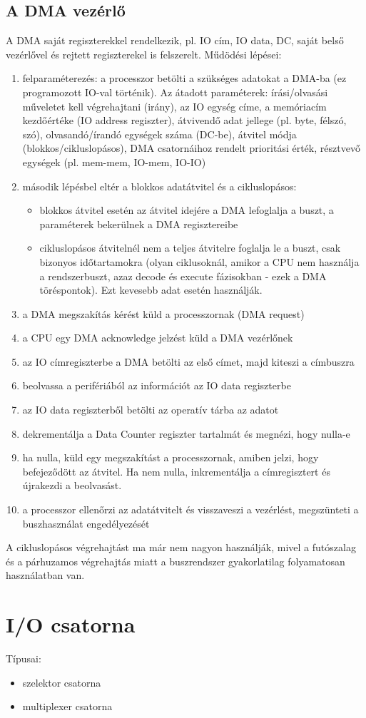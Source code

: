 \subsection{A DMA vezérlő}
A DMA saját regiszterekkel rendelkezik, pl. IO cím, IO data, DC, saját belső vezérlővel és rejtett regiszterekel is felszerelt.
Műdödési lépései:
\begin{enumerate}
    \item felparaméterezés: a processzor betölti a szükséges adatokat a DMA-ba (ez programozott IO-val történik). Az átadott paraméterek: írási/olvasási műveletet kell végrehajtani (irány), az IO egység címe, a memóriacím kezdőértéke (IO address regiszter), átvivendő adat jellege (pl. byte, félszó, szó), olvasandó/írandó egységek száma (DC-be), átvitel módja (blokkos/cikluslopásos), DMA csatornáihoz rendelt prioritási érték, résztvevő egységek (pl. mem-mem, IO-mem, IO-IO)
    \item második lépésbel eltér a blokkos adatátvitel és a cikluslopásos:
    \begin{itemize}
        \item blokkos átvitel esetén az átvitel idejére a DMA lefoglalja a buszt, a paraméterek bekerülnek a DMA regisztereibe
        \item cikluslopásos átvitelnél nem a teljes átvitelre foglalja le a buszt, csak bizonyos időtartamokra (olyan ciklusoknál, amikor a CPU nem használja a rendszerbuszt, azaz decode és execute fázisokban - ezek a DMA töréspontok). Ezt kevesebb adat esetén használják.
    \end{itemize}
    \item a DMA megszakítás kérést küld a processzornak (DMA request)
    \item a CPU egy DMA acknowledge jelzést küld a DMA vezérlőnek
    \item az IO címregiszterbe a DMA betölti az első címet, majd kiteszi a címbuszra
    \item beolvassa a perifériából az információt az IO data regiszterbe
    \item az IO data regiszterből betölti az operatív tárba az adatot
    \item dekrementálja a Data Counter regiszter tartalmát és megnézi, hogy nulla-e
    \item ha nulla, küld egy megszakítást a processzornak, amiben jelzi, hogy befejeződött az átvitel. Ha nem nulla, inkrementálja a címregisztert és újrakezdi a beolvasást.
    \item a processzor ellenőrzi az adatátvitelt és visszaveszi a vezérlést, megszünteti a buszhasználat engedélyezését
\end{enumerate}

A cikluslopásos végrehajtást ma már nem nagyon használják, mivel a futószalag és a párhuzamos végrehajtás miatt a buszrendszer gyakorlatilag folyamatosan használatban van.

\section{I/O csatorna}
Típusai:
\begin{itemize}
    \item szelektor csatorna
    \item multiplexer csatorna
\end{itemize}

